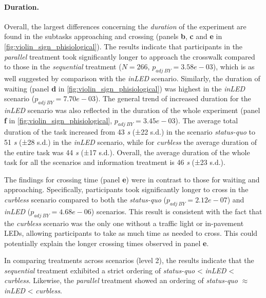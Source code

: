 \paragraph{Duration.} 

Overall, the largest differences concerning the \emph{duration} of the experiment are found in the subtasks approaching and crossing (panels \textbf{b}, \textbf{c} and \textbf{e} in \autoref{fig:violin_sign_phisiological}). 
The results indicate that participants in the \emph{parallel} treatment took significantly longer to approach the crosswalk compared to those in the \emph{sequential} treatment ($N=266$, $p_{adj\ BY}=3.58e-03$), which is as well suggested by comparison with the \emph{inLED} scenario. 
Similarly, the duration of waiting (panel \textbf{d} in \autoref{fig:violin_sign_phisiological}) was highest in the \emph{inLED} scenario ($p_{adj\ BY}=7.70e-03$).
The general trend of increased duration for the \emph{inLED} scenario was also reflected in the duration of the whole experiment (panel \textbf{f} in \autoref{fig:violin_sign_phisiological}, $p_{adj\ BY}=3.45e-03$). The average total duration of the task increased from 43 \emph{s} (±22 s.d.) in the scenario \emph{status-quo} to 51 \emph{s} (±28 s.d.) in the \emph{inLED} scenario, while for \emph{curbless} the average duration of the entire task was 44 \emph{s} (±17 s.d.). Overall, the average duration of the whole task for all the scenarios and information treatment is 46 \emph{s} (±23 s.d.).

The findings for crossing time (panel \textbf{e}) were in contrast to those for waiting and approaching. Specifically, participants took significantly longer to cross in the \emph{curbless} scenario compared to both the \emph{status-quo} ($p_{adj\ BY}=2.12e-07$) and \emph{inLED} ($p_{adj\ BY}=4.68e-06$) scenarios. This result is consistent with the fact that the \emph{curbless} scenario was the only one without a traffic light or in-pavement LEDs, allowing participants to take as much time as needed to cross. This could potentially explain the longer crossing times observed in panel \textbf{e}.

In comparing treatments across scenarios (level 2), the results indicate that the \emph{sequential} treatment exhibited a strict ordering of \emph{status-quo} < \emph{inLED} < \emph{curbless}. Likewise, the \emph{parallel} treatment showed an ordering of \emph{status-quo} $\approx$ \emph{inLED} < \emph{curbless}.

